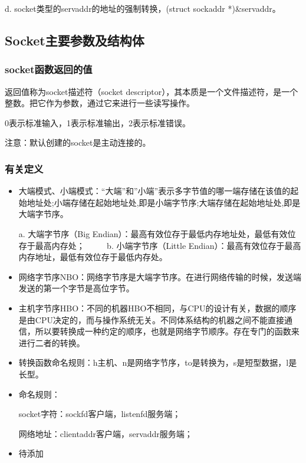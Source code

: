 \documentclass[UTF8]{article}%
\begin{document}
d. socket类型的servaddr的地址的强制转换，(struct sockaddr *)\&servaddr。

\subsection{Socket主要参数及结构体}

\subsubsection{socket函数返回的值}

返回值称为socket描述符（socket descriptor），其本质是一个文件描述符，是一个整数。把它作为参数，通过它来进行一些读写操作。

0表示标准输入，1表示标准输出，2表示标准错误。

注意：默认创建的socket是主动连接的。

\subsubsection{有关定义}

\begin{itemize}
    \item 大端模式、小端模式：“大端”和”小端”表示多字节值的哪一端存储在该值的起始地址处;小端存储在起始地址处,即是小端字节序;大端存储在起始地址处,即是大端字节序。
    
    a. 大端字节序（Big Endian）：最高有效位存于最低内存地址处，最低有效位存于最高内存处；
　　 
    b. 小端字节序（Little Endian）：最高有效位存于最高内存地址，最低有效位存于最低内存处。

    \item 网络字节序NBO：网络字节序是大端字节序。在进行网络传输的时候，发送端发送的第一个字节是高位字节。
    \item 主机字节序HBO：不同的机器HBO不相同，与CPU的设计有关，数据的顺序是由CPU决定的，而与操作系统无关。不同体系结构的机器之间不能直接通信，所以要转换成一种约定的顺序，也就是网络字节顺序。存在专门的函数来进行二者的转换。
    \item 转换函数命名规则：h主机、n是网络字节序，to是转换为，s是短型数据，l是长型。
    \item 命名规则：
    
    socket字符：sockfd客户端，listenfd服务端；

    网络地址：clientaddr客户端，servaddr服务端；
    \item 待添加

\end{itemize}
\end{document}

